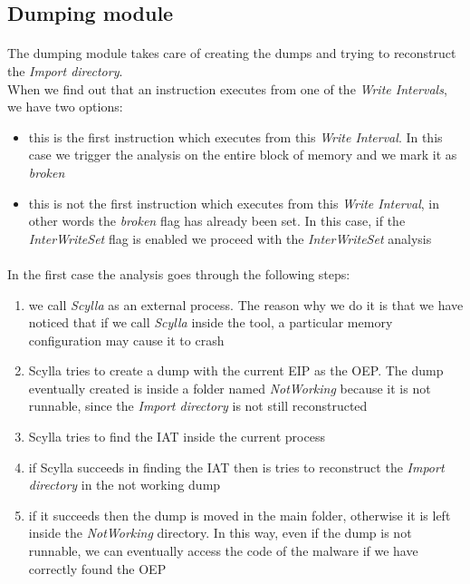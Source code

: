 \subsection{Dumping module}
\label{Dumping module}
\paragraph{}
The dumping module takes care of creating the dumps and trying to reconstruct the \textit{Import directory}.\\
When we find out that an instruction executes from one of the \textit{Write Intervals}, we have two options:
\begin{itemize}
\item this is the first instruction which executes from this \textit{Write Interval}. In this case we trigger the analysis on the entire block of memory and we mark it as \textit{broken}
\item this is not the first instruction which executes from this \textit{Write Interval}, in other words the \textit{broken} flag has already been set. In this case, if the \textit{InterWriteSet} flag is enabled we proceed with the \textit{InterWriteSet} analysis
\end{itemize}
\paragraph{}
In the first case the analysis goes through the following steps:
\begin{enumerate}
\item we call \textit{Scylla} as an external process. The reason why we do it is that we have noticed that if we call \textit{Scylla} inside the tool, a particular memory configuration may cause it to crash
\item Scylla tries to create a dump with the current \ac{EIP} as the \ac{OEP}. The dump eventually created is inside a folder named \textit{NotWorking} because it is not runnable, since the \textit{Import directory} is not still reconstructed
\item Scylla tries to find the \ac{IAT} inside the current process
\item if Scylla succeeds in finding the \ac{IAT} then is tries to reconstruct the \textit{Import directory} in the not working dump
\item if it succeeds then the dump is moved in the main folder, otherwise it is left inside the \textit{NotWorking} directory. In this way, even if the dump is not runnable, we can eventually access the code of the malware if we have correctly found the \ac{OEP}
\end{enumerate} 
